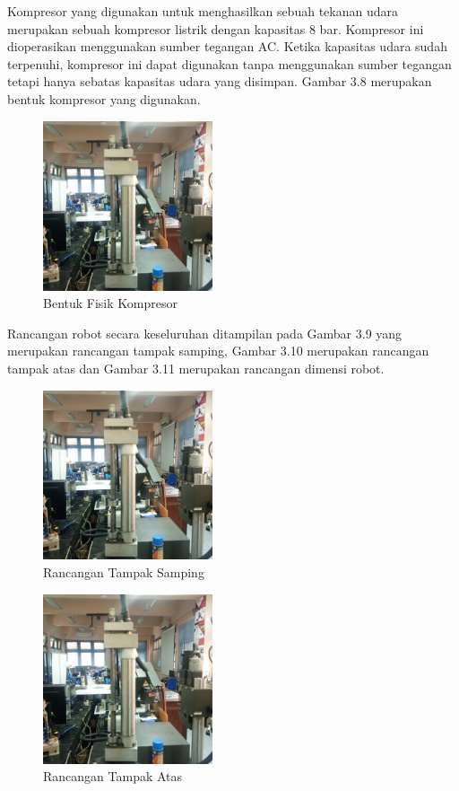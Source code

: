Kompresor yang digunakan untuk menghasilkan sebuah tekanan udara merupakan sebuah kompresor listrik dengan kapasitas 8 bar. Kompresor ini dioperasikan menggunakan sumber tegangan AC. Ketika kapasitas udara sudah terpenuhi, kompresor ini dapat digunakan tanpa menggunakan sumber tegangan tetapi hanya sebatas kapasitas udara yang disimpan. Gambar 3.8 merupakan bentuk kompresor yang digunakan.
\begin{figure}[H]
	\centering
	\includegraphics[width=5cm]{gambar/penuamticsementara.jpg}
	\caption{Bentuk Fisik Kompresor}
\end{figure}

Rancangan robot secara keseluruhan ditampilan pada Gambar 3.9 yang merupakan rancangan tampak samping, Gambar 3.10 merupakan rancangan tampak atas dan Gambar 3.11 merupakan rancangan dimensi robot. 
\begin{figure}[H]
	\centering
	\includegraphics[width=5cm]{gambar/penuamticsementara.jpg}
	\caption{Rancangan Tampak Samping}
\end{figure}

\begin{figure}[H]
	\centering
	\includegraphics[width=5cm]{gambar/penuamticsementara.jpg}
	\caption{Rancangan Tampak Atas}
\end{figure}

